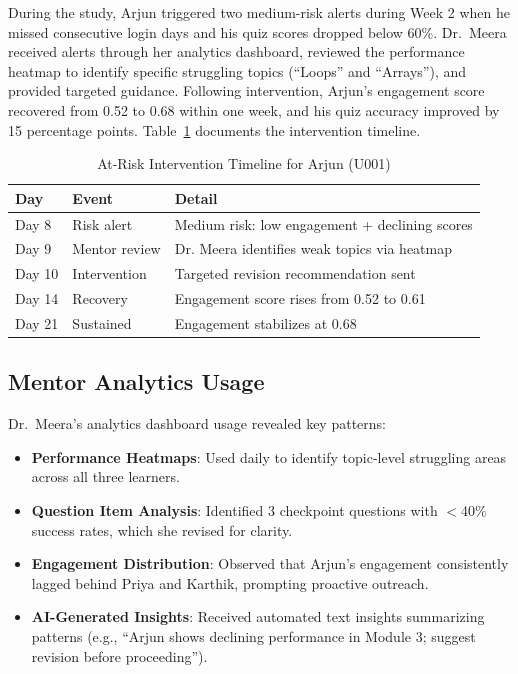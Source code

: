 \documentclass[conference]{IEEEtran}
\begin{document}
During the study, Arjun triggered two medium-risk alerts during Week 2 when he missed consecutive login days and his quiz scores dropped below 60\%. Dr.~Meera received alerts through her analytics dashboard, reviewed the performance heatmap to identify specific struggling topics (``Loops'' and ``Arrays''), and provided targeted guidance. Following intervention, Arjun's engagement score recovered from 0.52 to 0.68 within one week, and his quiz accuracy improved by 15 percentage points. Table~\ref{tab:intervention_timeline} documents the intervention timeline.

\begin{table}[htbp]
\caption{At-Risk Intervention Timeline for Arjun (U001)}
\label{tab:intervention_timeline}
\centering
\begin{tabular}{p{1cm}p{2cm}p{4.5cm}}
\toprule
\textbf{Day} & \textbf{Event} & \textbf{Detail} \\
\midrule
Day 8 & Risk alert & Medium risk: low engagement + declining scores \\
Day 9 & Mentor review & Dr. Meera identifies weak topics via heatmap \\
Day 10 & Intervention & Targeted revision recommendation sent \\
Day 14 & Recovery & Engagement score rises from 0.52 to 0.61 \\
Day 21 & Sustained & Engagement stabilizes at 0.68 \\
\bottomrule
\end{tabular}
\end{table}

\subsection{Mentor Analytics Usage}

Dr.~Meera's analytics dashboard usage revealed key patterns:
\begin{itemize}
    \item \textbf{Performance Heatmaps}: Used daily to identify topic-level struggling areas across all three learners.
    \item \textbf{Question Item Analysis}: Identified 3 checkpoint questions with $<$40\% success rates, which she revised for clarity.
    \item \textbf{Engagement Distribution}: Observed that Arjun's engagement consistently lagged behind Priya and Karthik, prompting proactive outreach.
    \item \textbf{AI-Generated Insights}: Received automated text insights summarizing patterns (e.g., ``Arjun shows declining performance in Module 3; suggest revision before proceeding'').
\end{itemize}
\end{document}
